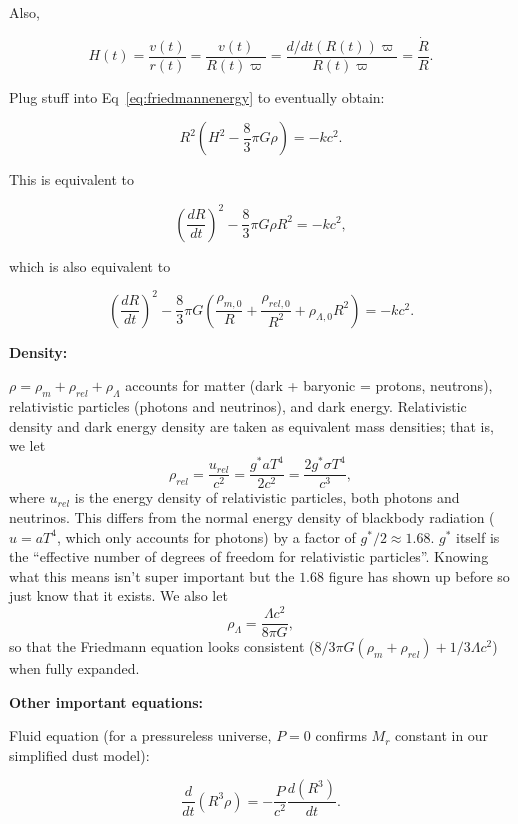 \documentclass[11pt]{article}
\newcommand{\V}{

\vspace{\baselineskip}

}
\begin{document}
Also, 

\[H(t) = \frac{v(t)}{r(t)} = \frac{v(t)}{R(t)\varpi} = \frac{d/dt(R(t))\varpi}{R(t)\varpi} = \frac{\dot{R}}{R}.\]

Plug stuff into Eq~\ref{eq:friedmannenergy} to eventually obtain:

\begin{equation*}
R^{2}\left(H^{2} - \frac{8}{3}\pi G\rho \right) = -kc^{2}.
\end{equation*}

This is equivalent to 

\begin{equation*}
\left(\frac{dR}{dt}\right)^{2} - \frac{8}{3}\pi G\rho R^{2} = -kc^{2},
\end{equation*}

which is also equivalent to 

\begin{equation*}
\left(\frac{dR}{dt}\right)^{2} - \frac{8}{3}\pi G\left(\frac{\rho_{m,0}}{R} + \frac{\rho_{rel,0}}{R^{2}} +\rho_{\Lambda,0}R^{2}\right) = -kc^{2}.
\end{equation*}


\textbf{Density:}

$\rho = \rho_{m} + \rho_{rel} + \rho_{\Lambda}$ accounts for matter (dark + baryonic = protons, neutrons), relativistic particles (photons and neutrinos), and dark energy. Relativistic density and dark energy density are taken as equivalent mass densities; that is, we let 
\[\rho_{rel} = \frac{u_{rel}}{c^{2}} = \frac{g^{*}aT^{4}}{2c^{2}} = \frac{2g^{*}\sigma T^{4}}{c^{3}},\]
where $u_{rel}$ is the energy density of relativistic particles, both photons and neutrinos. This differs from the normal energy density of blackbody radiation ($u=aT^{4}$, which only accounts for photons) by a factor of $g^{*}/2\approx 1.68$. $g^{*}$ itself is the ``effective number of degrees of freedom for relativistic particles''. Knowing what this means isn't super important but the $1.68$ figure has shown up before so just know that it exists. We also let 
\[\rho_{\Lambda} = \frac{\Lambda c^{2}}{8\pi G},\]
so that the Friedmann equation looks consistent ($8/3\pi G(\rho_{m}+\rho_{rel}) + 1/3\Lambda c^{2}$) when fully expanded.\V

\textbf{Other important equations:}

Fluid equation (for a pressureless universe, $P=0$ confirms $M_{r}$ constant in our simplified dust model):

\[\frac{d}{dt}(R^{3}\rho) = -\frac{P}{c^{2}}\frac{d(R^{3})}{dt}.\]
\end{document}
